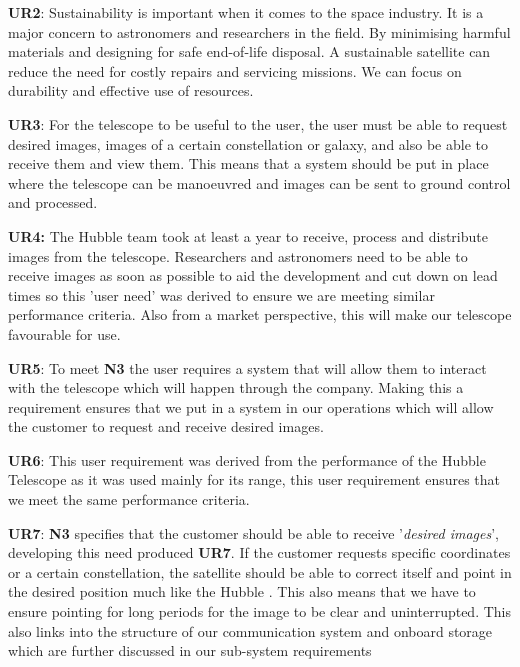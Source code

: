 \textbf{UR2}:
Sustainability is important when it comes to the space industry. It is a major concern to astronomers and researchers in the field. By minimising harmful materials and designing for safe end-of-life disposal. A sustainable satellite can reduce the need for costly repairs and servicing missions. We can focus on durability and effective use of resources.\\
\vspace{1.5mm}

\textbf{UR3}:
For the telescope to be useful to the user, the user must be able to request desired images, images of a certain constellation or galaxy, and also be able to receive them and view them. This means that a system should be put in place where the telescope can be manoeuvred and images can be sent to ground control and processed.\\
\vspace{1.5mm}

\textbf{UR4:}
The Hubble team took at least a year to receive, process and distribute images from the telescope. Researchers and astronomers need to be able to receive images as soon as possible to aid the development and cut down on lead times so this 'user need' was derived to ensure we are meeting similar performance criteria. Also from a market perspective, this will make our telescope favourable for use.\\
\vspace{1.5mm}

\textbf{UR5}: To meet \textbf{N3} the user requires a system that will allow them to interact with the telescope which will happen through the company. Making this a requirement ensures that we put in a system in our operations which will allow the customer to request and receive desired images.

\textbf{UR6}: This user requirement was derived from the performance of the Hubble Telescope as it was used mainly for its range, this user requirement ensures that we meet the same performance criteria.\\
\vspace{1.5mm}

\textbf{UR7}: \textbf{N3} specifies that the customer should be able to receive '\textit{desired images}', developing this need produced \textbf{UR7}. If the customer requests specific coordinates or a certain constellation, the satellite should be able to correct itself and point in the desired position much like the Hubble \cite{NASA2023_Img}. This also means that we have to ensure pointing for long periods for the image to be clear and uninterrupted. This also links into the structure of our communication system and onboard storage which are further discussed in our sub-system requirements \\
\vspace{1.5mm}

